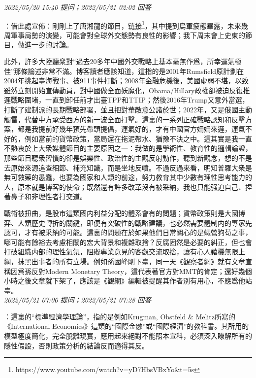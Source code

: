 \documentclass[twocolumn]{ctexart}
\begin{document}
\textit{\hfill\noindent\small 2022/05/20 15:40 提问；2022/05/21 02:02 回答}

：借此處宣佈：剛剛上了唐湘龍的節目，\href{https://www.youtube.com/watch?v=yD7HbsVBxYo\&t=5s}{链接\footnote{\url{https://www.youtube.com/watch?v=yD7HbsVBxYo\&t=5s}}}，其中提到烏軍疲態畢露，未來幾周軍事局勢的演變，可能會對全球外交態勢有良性的影響；我下周末會上史東的節目，做進一步的討論。

此外，許多大陸聽衆對“過去20多年中國外交戰略上基本毫無作爲，所幸運氣極佳”那條論述非常不滿。博客讀者應該知道，這指的是2001年Rumsfield原計劃在2004年挑起臺海戰事、被911事件打斷；2008年金融危機後，美國虛弱不堪，以致雖然立刻開始宣傳動員，對中國做全面妖魔化，Obama/Hillary政權卻被迫反復推遲戰略圍堵，一直到卸任前才出臺TPP和TTIP；然後2016年Trump又意外當選，打斷了建制派的長期戰略部署，並且把對華敵意公諸於世；2022年，又是俄國主動觸雷，代替中方承受西方的新一波全面打擊。這裏的一系列正確戰略認知和反擊方案，都是我提前好幾年預先帶頭提倡，運氣好的，才有中國官方姍姍來遲，運氣不好的，例如當前的貨幣政策，當局還在拖泥帶水、猶豫不決之中。這其實是我一直不熱衷於上大衆媒體節目的主要原因之一：我做的是學術性、教育性的邏輯論證，那些節目聽衆習慣的卻是娛樂性、政治性的主觀反射動作，聽到新觀念，想的不是去原始來源追查細節、補充知識，而是坐地反噴。不過反過來看，明知普羅大衆是無可救藥的愚蠢，也要為國家和人類的前途，努力教育其中少數有理性思考能力的人，原本就是博客的使命；既然還有許多改革沒有被采納，我也只能强迫自己、捏著鼻子和非理性者打交道。


戰術被扭曲，是股市這類國内利益分配的體系會有的問題；貨幣政策則是大國博弈、人類歷史轉折的關鍵，即便有突破性的戰略建議，也必然需要體制内的專家先認可，才有被采納的可能。這裏的問題在於如果他們日常關心的是蠅營狗苟之事，哪可能有餘裕去考慮相關的宏大背景和複雜取捨？反腐固然是必要的糾正，但也會打破組織内部的理性氣氛，阻礙專業意見的客觀交流取捨，讓有心人藉機無限上綱，抹黑出事者的所有立場。例如孫國峰剛下臺，同一天《觀察者網》就有文章宣稱因爲孫反對Modern Monetary Theory，這代表著官方對MMT的肯定；還好幾個小時之後文章就下架了，應該是《觀網》編輯被提醒其作者別有用心，不應爲他站臺。
\\

\textit{\hfill\noindent\small 2022/05/21 07:06 提问；2022/05/21 07:28 回答}

：這裏的“標準經濟學理論”，指的是例如Krugman, Obstfeld \& Melitz所寫的《International Economics》這類的“國際金融”或“國際經濟”的教科書。其所用的模型極度簡化，完全脫離現實，應用起來絕對不能照本宣科，必須深入瞭解所有的隱性假設，否則政策分析的結論反而適得其反。
\\
\end{document}

